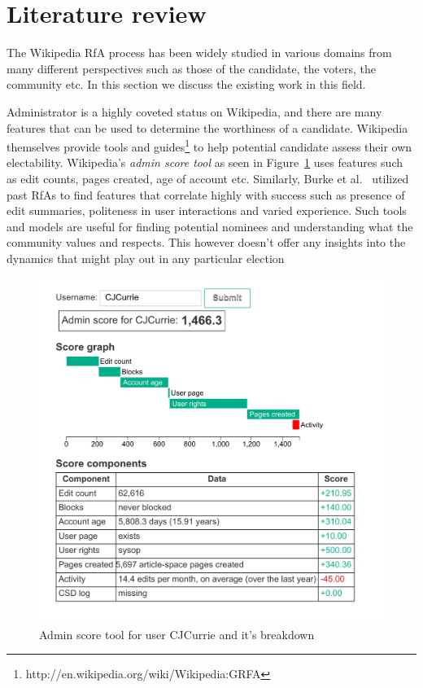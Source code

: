 \section{Literature review}
\label{sec:literature-review}

The Wikipedia RfA process has been widely studied in various domains from many different perspectives such as those of the candidate, the voters, the community etc. In this section we discuss the existing work in this field.

Administrator is a highly coveted status on Wikipedia, and there are many features that can be used to determine the worthiness of a candidate. Wikipedia themselves provide tools and guides\footnote{http://en.wikipedia.org/wiki/Wikipedia:GRFA} to help potential candidate assess their own electability. Wikipedia's \textit{admin score tool} as seen in Figure~\ref{fig:admin-score} uses features such as edit counts, pages created, age of account etc. Similarly, Burke et al.\ \cite{BurkeMoppingUp} utilized past RfAs to find features that correlate highly with success such as presence of edit summaries, politeness in user interactions and varied experience. Such tools and models are useful for finding potential nominees and understanding what the community values and respects. This however doesn't offer any insights into the dynamics that might play out in any particular election
\begin{figure}[h!]
    \centering
    \includegraphics[width=\linewidth]{images/Asynchronous Admin Score.pdf}
    \caption{Admin score tool for user CJCurrie and it's breakdown}
    \label{fig:admin-score}
\end{figure}

